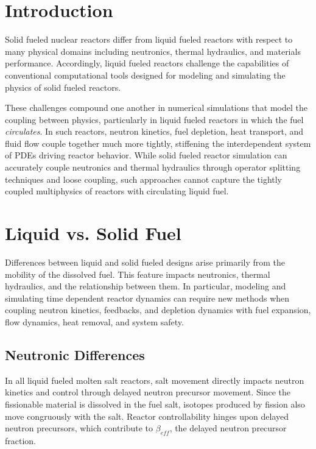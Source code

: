 \section{Introduction}

Solid fueled nuclear reactors differ from liquid fueled reactors with respect 
to many physical domains including neutronics, thermal hydraulics, and 
materials performance. Accordingly, liquid fueled reactors challenge the 
capabilities of conventional computational tools designed for modeling and simulating 
the physics of solid fueled reactors. 

These challenges compound one another in numerical simulations that model the 
coupling between physics, particularly in liquid fueled reactors in which the 
fuel \emph{circulates}. In such reactors, neutron kinetics, fuel depletion, 
heat transport, and fluid flow couple together much more tightly, stiffening 
the interdependent system of \glspl{PDE} driving reactor behavior.
While solid fueled reactor simulation can accurately couple 
neutronics and thermal hydraulics through operator splitting techniques and 
loose coupling, such approaches cannot capture the tightly coupled 
multiphysics of reactors with circulating liquid fuel.

\section{Liquid vs. Solid Fuel}
Differences between liquid and solid fueled designs arise primarily from the 
mobility of the dissolved fuel. This feature impacts neutronics, thermal 
hydraulics, and the relationship between them. In particular, modeling and 
simulating time dependent reactor dynamics can require new methods when coupling 
neutron kinetics, feedbacks, and depletion dynamics with fuel expansion, flow
dynamics, heat removal, and system safety. 

\subsection{Neutronic Differences}

In all liquid fueled molten salt reactors, salt movement directly impacts 
neutron kinetics and control through delayed neutron precursor movement. Since 
the fissionable material is dissolved in the fuel salt, isotopes produced by 
fission also move congruously with the salt. Reactor controllability hinges upon 
delayed neutron precursors, which contribute to $\beta_{eff}$, the delayed 
neutron precursor fraction.

